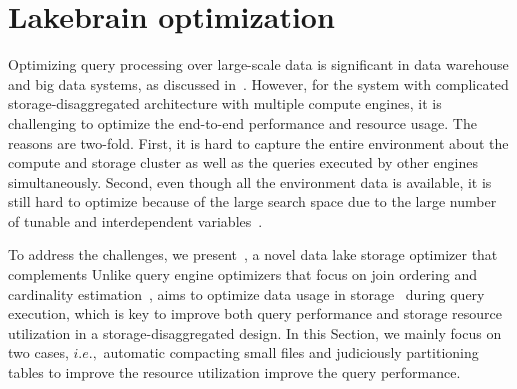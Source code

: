 \section{Lakebrain optimization} 
\label{sec:lakebrain}

Optimizing  query processing over large-scale data is significant in data warehouse and big data systems, as discussed in~\cite{}. However, for the \sys system with
complicated storage-disaggregated architecture with  multiple compute engines, it is challenging to optimize the end-to-end performance and resource usage. The reasons are two-fold. First, it is hard to capture the entire environment about the compute and storage cluster as well as the queries executed by other engines simultaneously. Second, even though all the environment data is available, it is still hard to optimize because of the large search space due to the large number of tunable and interdependent variables~\cite{}.



To address the challenges, we present~\brain, a novel data lake storage optimizer that complements  Unlike query engine optimizers that focus on join ordering and cardinality estimation~\cite{}, \brain aims to optimize data usage in storage~ during query execution, which is key to improve both query performance and storage resource utilization in a storage-disaggregated design. In this Section, we mainly focus on two cases, $i.e.,$ automatic compacting small files  and judiciously partitioning tables to improve the resource utilization improve the query performance. 







